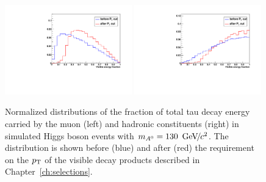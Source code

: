 \begin{figure}[t]
\begin{center}
\includegraphics*[width=0.49\textwidth]{svfit_chapter/figures/scuplting_A130_muon.pdf}
\includegraphics*[width=0.49\textwidth]{svfit_chapter/figures/scuplting_A130_tau.pdf}
\caption[Effect of the visible \pt requirements on muon and hadronic $\tau$
decays]{\captiontext Normalized distributions of the fraction of total tau decay
energy carried by the muon (left) and hadronic constituents (right) in simulated
Higgs boson events with \mbox{$m_{A^0} = 130~{\,\text{Ge\hspace{-.08em}V\hspace{-0.16em}/\hspace{-0.08em}}c^\text{2}}$}.  The distribution is shown before
(blue) and after (red) the requirement on the $p_{\mathrm{T}}$ of the visible decay
products described in Chapter~\ref{ch:selections}.  }
\label{fig:ptBalancePtVisCuts}
\end{center}
\end{figure} 

